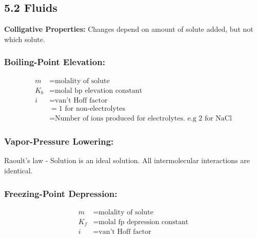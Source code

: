 \subsection{5.2 Fluids}
    \textbf{Colligative Properties: }Changes depend on amount of solute added, but not which solute.
    
    \subsubsection{Boiling-Point Elevation: }
        \begin{align*}
            m & = \text{molality of solute}\\
            K_b & = \text{molal bp elevation constant}\\
            i & = \text{van't Hoff factor}\\
            & = 1 \text{ for non-electrolytes}\\
            & = \text{Number of ions produced for electrolytes. e.g 2 for NaCl}
        \end{align*}
    
    \subsubsection{Vapor-Pressure Lowering: }
    
        Raoult's law - Solution is an ideal solution. All intermolecular interactions are identical. 
        \vspace*{0.5em}

    \subsubsection{Freezing-Point Depression: }
        \begin{align*}
            m & = \text{molality of solute}\\
            K_f & = \text{molal fp depression constant}\\
            i & = \text{van't Hoff factor}
        \end{align*}